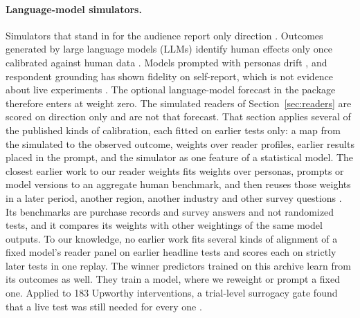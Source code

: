 \paragraph{Language-model simulators.}
Simulators that stand in for the audience report only direction \cite{li2026simgym,hut2026can}. Outcomes generated by large language models (LLMs) identify human effects only once calibrated against human data \cite{persson2026statistical,ankargren2026when}. Models prompted with personas drift \cite{bisbee2024synthetic}, and respondent grounding has shown fidelity on self-report, which is not evidence about live experiments \cite{park2024llm}. The optional language-model forecast in the package therefore enters at weight zero. The simulated readers of Section~\ref{sec:readers} are scored on direction only and are not that forecast. That section applies several of the published kinds of calibration, each fitted on earlier tests only: a map from the simulated to the observed outcome, weights over reader profiles, earlier results placed in the prompt, and the simulator as one feature of a statistical model. The closest earlier work to our reader weights fits weights over personas, prompts or model versions to an aggregate human benchmark, and then reuses those weights in a later period, another region, another industry and other survey questions \cite{leng2026reducing}. Its benchmarks are purchase records and survey answers and not randomized tests, and it compares its weights with other weightings of the same model outputs. To our knowledge, no earlier work fits several kinds of alignment of a fixed model's reader panel on earlier headline tests and scores each on strictly later tests in one replay. The winner predictors trained on this archive \cite{ye2025lola,clark2026predict,khimani2026finetuning} learn from its outcomes as well. They train a model, where we reweight or prompt a fixed one.
Applied to 183 Upworthy interventions, a trial-level surrogacy gate found that a live test was still needed for every one \cite{schultzberg2026when}.

